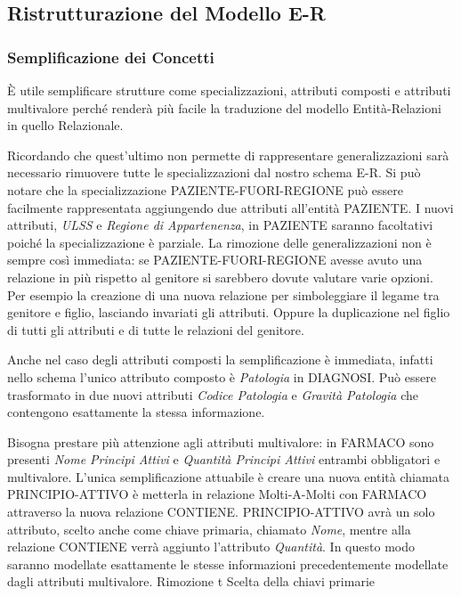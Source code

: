 \documentclass{article}
\begin{document}
\subsection{Ristrutturazione del Modello E-R}
\subsubsection{Semplificazione dei Concetti}

È utile semplificare strutture come specializzazioni, attributi composti e
attributi multivalore perché renderà più facile la traduzione del modello
Entità-Relazioni in quello Relazionale.

Ricordando che quest'ultimo non permette di rappresentare generalizzazioni sarà
necessario rimuovere tutte le specializzazioni dal nostro schema E-R.  Si può
notare che la specializzazione PAZIENTE-FUORI-REGIONE può essere facilmente
rappresentata aggiungendo due attributi all'entità PAZIENTE.  I nuovi
attributi, \textit{ULSS} e \textit{Regione di Appartenenza}, in PAZIENTE
saranno facoltativi poiché la specializzazione è parziale.  La rimozione delle
generalizzazioni non è sempre così immediata: se PAZIENTE-FUORI-REGIONE avesse
avuto una relazione in più rispetto al genitore si sarebbero dovute valutare
varie opzioni.  Per esempio la creazione di una nuova relazione per
simboleggiare il legame tra genitore e figlio, lasciando invariati gli
attributi.  Oppure la duplicazione nel figlio di tutti gli attributi e di tutte
le relazioni del genitore.  

Anche nel caso degli attributi composti la semplificazione è immediata, infatti
nello schema l'unico attributo composto è \textit{Patologia} in DIAGNOSI.  Può
essere trasformato in due nuovi attributi \textit{Codice Patologia} e
\textit{Gravità Patologia} che contengono esattamente la stessa informazione.

Bisogna prestare più attenzione agli attributi multivalore: in FARMACO sono
presenti \textit{Nome Principi Attivi} e \textit{Quantità Principi Attivi}
entrambi obbligatori e multivalore.  L'unica semplificazione attuabile è creare
una nuova entità chiamata PRINCIPIO-ATTIVO è metterla in relazione
Molti-A-Molti con FARMACO attraverso la nuova relazione CONTIENE.
PRINCIPIO-ATTIVO avrà un solo attributo, scelto anche come chiave primaria,
chiamato \textit{Nome}, mentre alla relazione CONTIENE verrà aggiunto
l'attributo \textit{Quantità}.  In questo modo saranno modellate esattamente le
stesse informazioni precedentemente modellate dagli attributi multivalore.
Rimozione t Scelta della chiavi primarie
\end{document}
